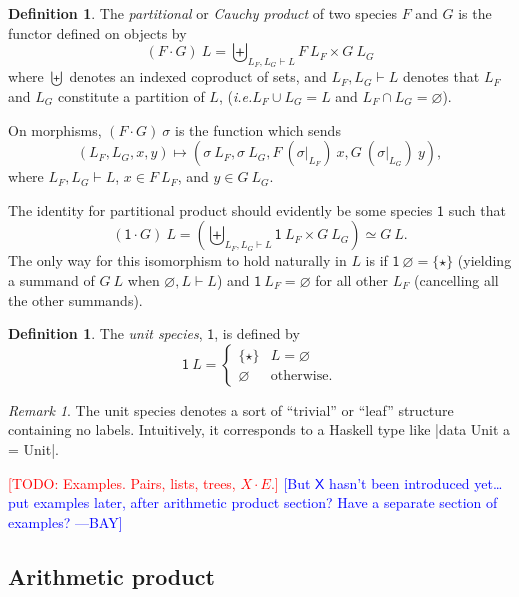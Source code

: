 \documentclass[preprint,authoryear]{sigplanconf}
\newcommand{\authornote}[3]{\textcolor{#1}{[#3 ---#2]}}
\newcommand{\todo}[1]{\textcolor{red}{[TODO: #1]}}
\newcommand{\authornote}[3]{}
\newcommand{\todo}[1]{}
\newcommand{\bay}[1]{\authornote{blue}{BAY}{#1}}
\newcommand{\ie}{\latin{i.e.}\xspace}
\newcommand{\term}[1]{\emph{#1}}
\newcommand{\latin}[1]{\textit{#1}}
\newcommand{\msf}[1]{\ensuremath{\mathsf{#1}}\xspace}
\newcommand{\union}{\cup}
\newcommand{\intersect}{\cap}
\newcommand{\singleton}{\{\star\}}
\newcommand{\partition}{\vdash}
\renewcommand{\equiv}{\simeq}         %
\theoremstyle{definition}
\newtheorem{defn}[thm]{Definition}
\theoremstyle{remark}
\newtheorem*{rem}{Remark}
\providecommand{\Sp}{}
\renewcommand{\Sp}{\msf}
\newcommand{\X}{\Sp{X}}
\newcommand{\One}{\msf{1}}
\newcommand{\sprod}{\cdot}
\begin{document}
\begin{defn}
  The \term{partitional} or \term{Cauchy product} of two species $F$
  and $G$ is the functor defined on objects by \[ (F \sprod G)\ L =
  \biguplus_{L_F,L_G \partition L} F\ L_F \times G\ L_G \] where
  $\biguplus$ denotes an indexed coproduct of sets, and $L_F,L_G
  \partition L$ denotes that $L_F$ and $L_G$ constitute a partition of
  $L$, (\ie $L_F \union L_G = L$ and $L_F \intersect L_G =
  \varnothing$).

  On morphisms, $(F \cdot G)\ \sigma$ is the function which sends \[
  (L_F,L_G, x, y) \mapsto (\sigma\ L_F, \sigma\ L_G, F\ (\sigma
  \vert_{L_F})\ x, G\ (\sigma \vert_{L_G})\ y), \] where $L_F,L_G
  \partition L$, $x \in F\ L_F$, and $y \in G\ L_G$.
\end{defn}

The identity for partitional product should evidently be some species
$\One$ such that \[ (\One \cdot G)\ L = \left(\biguplus_{L_F,L_G
    \partition L} \One\ L_F \times G\ L_G \right) \equiv G\ L. \] The only
way for this isomorphism to hold naturally in $L$ is if $\One\
\varnothing = \singleton$ (yielding a summand of $G\ L$ when
$\varnothing,L \partition L$) and $\One\ L_F = \varnothing$ for all other $L_F$
(cancelling all the other summands).

\begin{defn}
  The \term{unit species}, $\One$, is defined by
  \[ \One\ L =
  \begin{cases}
    \singleton & L = \varnothing \\
    \varnothing & \text{otherwise}.
  \end{cases}
  \]
\end{defn}

\begin{rem}
  The unit species denotes a sort of ``trivial'' or ``leaf'' structure
  containing no labels.  Intuitively, it corresponds to a Haskell type
  like |data Unit a = Unit|.
\end{rem}

\todo{Examples.  Pairs, lists, trees, $X \cdot E$.} \bay{But $\X$
  hasn't been introduced yet\dots put examples later, after arithmetic
  product section?  Have a separate section of examples?}

\subsection{Arithmetic product}
\label{sec:arithmetic-product}

\newcommand{\aprod}{\boxtimes}
\end{document}
